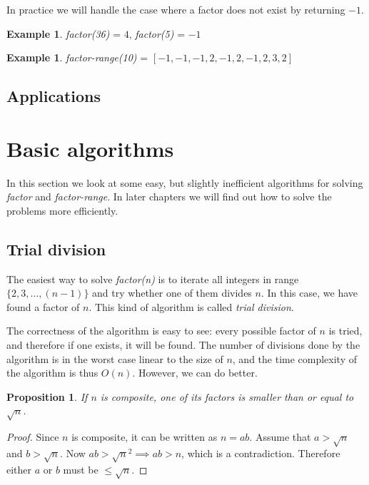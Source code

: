 \documentclass[12pt] {article}
\theoremstyle{plain}
\newtheorem{prop}[thm]{Proposition}
\theoremstyle{definition}
\newtheorem{exmp}[thm]{Example}
\begin{document}
In practice we will handle the case where a factor does not exist by returning $-1$.

\begin{exmp}
\textit{factor(36)} = $4$, \textit{factor(5)} = $-1$
\end{exmp}

\begin{exmp}
\textit{factor-range(10)} = $[-1, -1, -1, 2, -1, 2, -1, 2, 3, 2]$
\end{exmp}

\subsection {Applications}

\section {Basic algorithms}

In this section we look at some easy, but slightly inefficient algorithms for solving \textit{factor} and \textit{factor-range}. In later chapters we will find out how to solve the problems more efficiently.

\subsection {Trial division}

The easiest way to solve \textit{factor(n)} is to iterate all integers in range $\{2, 3, \dots, (n-1)\}$ and try whether one of them divides $n$. In this case, we have found a factor of $n$. This kind of algorithm is called \textit{trial division}. 

The correctness of the algorithm is easy to see: every possible factor of $n$ is tried, and therefore if one exists, it will be found. The number of divisions done by the algorithm is in the worst case linear to the size of $n$, and the time complexity of the algorithm is thus $O(n)$. However, we can do better.

\begin{prop}
\label {prop:factupperbound}
If $n$ is composite, one of its factors is smaller than or equal to $\sqrt{n}$.
\end{prop}

\begin{proof}
Since $n$ is composite, it can be written as $n = ab$. Assume that $a > \sqrt{n}$ and $b > \sqrt{n}$. Now $ab > \sqrt{n}^2 \implies ab > n$, which is a contradiction. Therefore either $a$ or $b$ must be $\leq \sqrt{n}$.
\end{proof}
\end{document}
